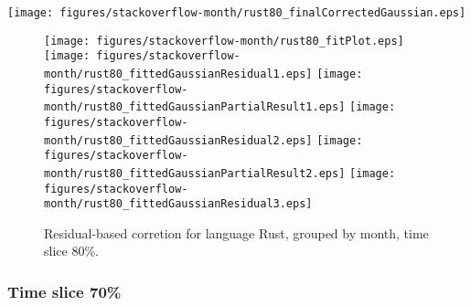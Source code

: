\begin{center}
{\texttt{[image: figures/stackoverflow-month/rust80\_finalCorrectedGaussian.eps]}}
\end{center}

\FloatBarrier

\begin{figure}[t]
\centering
{}
{\texttt{[image: figures/stackoverflow-month/rust80\_fitPlot.eps]}}
{\texttt{[image: figures/stackoverflow-month/rust80\_fittedGaussianResidual1.eps]}}
{\texttt{[image: figures/stackoverflow-month/rust80\_fittedGaussianPartialResult1.eps]}}
{\texttt{[image: figures/stackoverflow-month/rust80\_fittedGaussianResidual2.eps]}}
{\texttt{[image: figures/stackoverflow-month/rust80\_fittedGaussianPartialResult2.eps]}}
{\texttt{[image: figures/stackoverflow-month/rust80\_fittedGaussianResidual3.eps]}}
\caption{Residual-based corretion for language Rust, grouped by month, time slice 80\%.}
\end{figure}


\FloatBarrier


\subsubsection{Time slice 70\%}

